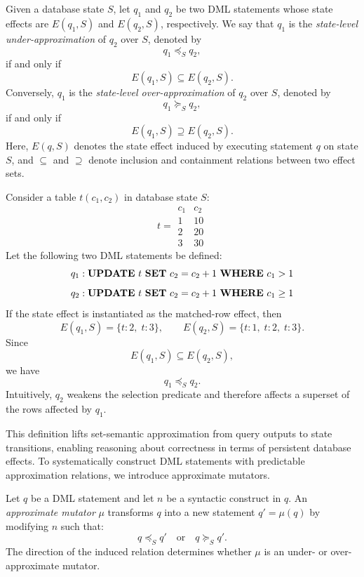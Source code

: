 \begin{definition}
	\label{def:state_approximation}
	
	Given a database state \( S \), let \( q_1 \) and \( q_2 \) be two DML statements whose state effects are \( E(q_1, S) \) and \( E(q_2, S) \), respectively.  
	We say that \( q_1 \) is the \textit{state-level under-approximation} of \( q_2 \) over \( S \), denoted by
	\[
	q_1 \preceq_S q_2,
	\]
	if and only if
	\[
	E(q_1, S) \subseteq E(q_2, S).
	\]
	Conversely, \( q_1 \) is the \textit{state-level over-approximation} of \( q_2 \) over \( S \), denoted by
	\[
	q_1 \succeq_S q_2,
	\]
	if and only if
	\[
	E(q_1, S) \supseteq E(q_2, S).
	\]
	Here, \( E(q,S) \) denotes the state effect induced by executing statement \( q \) on state \( S \), and \( \subseteq \) and \( \supseteq \) denote inclusion and containment relations between two effect sets.
\end{definition}

\begin{example}
	Consider a table \( t(c_1, c_2) \) in database state \( S \):
	\[
	t =
	\begin{array}{c|c}
		c_1 & c_2 \\
		\hline
		1 & 10 \\
		2 & 20 \\
		3 & 30
	\end{array}
	\]
	Let the following two DML statements be defined:
	\[
	q_1 : \text{\textbf{UPDATE} } t \text{ \textbf{SET} } c_2 = c_2 + 1
	\text{ \textbf{WHERE} } c_1 > 1
	\]
	\[
	q_2 : \text{\textbf{UPDATE} } t \text{ \textbf{SET} } c_2 = c_2 + 1
	\text{ \textbf{WHERE} } c_1 \ge 1
	\]
	If the state effect is instantiated as the matched-row effect, then
	\[
	E(q_1, S) = \{t\!:\!2,\; t\!:\!3\}, \qquad
	E(q_2, S) = \{t\!:\!1,\; t\!:\!2,\; t\!:\!3\}.
	\]
	Since
	\[
	E(q_1, S) \subseteq E(q_2, S),
	\]
	we have
	\[
	q_1 \preceq_S q_2.
	\]
	Intuitively, \( q_2 \) weakens the selection predicate and therefore affects a superset of the rows affected by \( q_1 \).
\end{example}

This definition lifts set-semantic approximation from query outputs to state transitions, enabling reasoning about correctness in terms of persistent database effects.
To systematically construct DML statements with predictable approximation relations, we introduce approximate mutators.

\begin{definition}
	\label{def:approx_mutator}
	
	Let $q$ be a DML statement and let $n$ be a syntactic construct in $q$.  
	An \textit{approximate mutator} $\mu$ transforms $q$ into a new statement $q' = \mu(q)$ by modifying $n$ such that:
	\[
	q \preceq_S q' \quad \text{or} \quad q \succeq_S q'.
	\]
	The direction of the induced relation determines whether $\mu$ is an under- or over-approximate mutator.
\end{definition}

